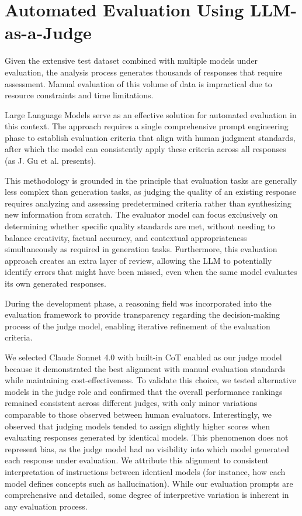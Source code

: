\section{Automated Evaluation Using LLM-as-a-Judge}
\label{sec:llm-judge}

Given the extensive test dataset combined with multiple models under evaluation, the analysis process generates thousands of responses that require assessment.
Manual evaluation of this volume of data is impractical due to resource constraints and time limitations.

Large Language Models serve as an effective solution for automated evaluation in this context.
The approach requires a single comprehensive prompt engineering phase to establish evaluation criteria that align with human judgment standards, after which the model can consistently apply these criteria across all responses (as J. Gu et al. \cite{llmasajudge_survey} presents).

This methodology is grounded in the principle that evaluation tasks are generally less complex than generation tasks, as judging the quality of an existing response requires analyzing and assessing predetermined criteria rather than synthesizing new information from scratch.
The evaluator model can focus exclusively on determining whether specific quality standards are met, without needing to balance creativity, factual accuracy, and contextual appropriateness simultaneously as required in generation tasks.
Furthermore, this evaluation approach creates an extra layer of review, allowing the LLM to potentially identify errors that might have been missed, even when the same model evaluates its own generated responses.

During the development phase, a reasoning field was incorporated into the evaluation framework to provide transparency regarding the decision-making process of the judge model, enabling iterative refinement of the evaluation criteria.

We selected Claude Sonnet 4.0 with built-in CoT enabled as our judge model because it demonstrated the best alignment with manual evaluation standards while maintaining cost-effectiveness.
To validate this choice, we tested alternative models in the judge role and confirmed that the overall performance rankings remained consistent across different judges, with only minor variations comparable to those observed between human evaluators.
Interestingly, we observed that judging models tended to assign slightly higher scores when evaluating responses generated by identical models. This phenomenon does not represent bias, as the judge model had no visibility into which model generated each response under evaluation.
We attribute this alignment to consistent interpretation of instructions between identical models (for instance, how each model defines concepts such as hallucination).
While our evaluation prompts are comprehensive and detailed, some degree of interpretive variation is inherent in any evaluation process.

